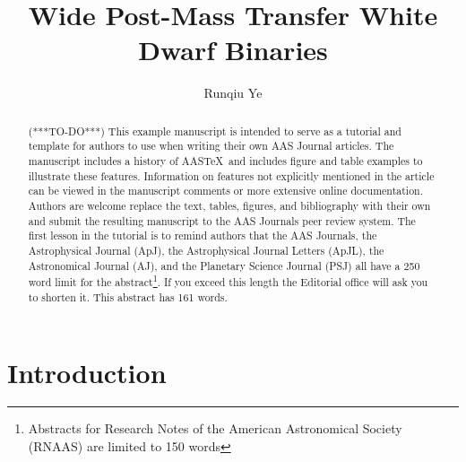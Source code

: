 \documentclass[linenumbers]{aastex631}
\newcommand\aastex{AAS\TeX}
\begin{document}
\title{Wide Post-Mass Transfer White Dwarf Binaries}


\author{Runqiu Ye}

%
%
%

\begin{abstract}

(***TO-DO***) This example manuscript is intended to serve as a tutorial and template for
authors to use when writing their own AAS Journal articles. The manuscript
includes a history of \aastex\ and includes figure and table examples to illustrate these features. Information on features not explicitly mentioned in the article can be viewed in the manuscript comments or more extensive online
documentation. Authors are welcome replace the text, tables, figures, and
bibliography with their own and submit the resulting manuscript to the AAS
Journals peer review system.  The first lesson in the tutorial is to remind
authors that the AAS Journals, the Astrophysical Journal (ApJ), the
Astrophysical Journal Letters (ApJL), the Astronomical Journal (AJ), and
the Planetary Science Journal (PSJ) all have a 250 word limit for the 
abstract\footnote{Abstracts for Research Notes of the American Astronomical 
Society (RNAAS) are limited to 150 words}.  If you exceed this length the
Editorial office will ask you to shorten it. This abstract has 161 words.

\end{abstract}



\section{Introduction} \label{sec:intro}
\end{document}
